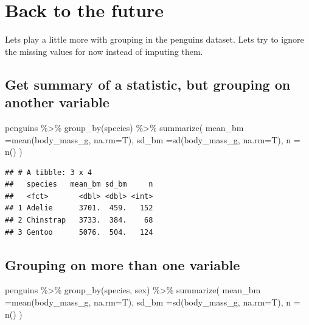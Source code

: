 \documentclass[
]{book}
\newenvironment{Shaded}{\begin{snugshade}}{\end{snugshade}}
\newcommand{\AttributeTok}[1]{\textcolor[rgb]{0.77,0.63,0.00}{#1}}
\newcommand{\FunctionTok}[1]{\textcolor[rgb]{0.00,0.00,0.00}{#1}}
\newcommand{\NormalTok}[1]{#1}
\newcommand{\SpecialCharTok}[1]{\textcolor[rgb]{0.00,0.00,0.00}{#1}}
\begin{document}
\hypertarget{back-to-the-future}{%
\section{Back to the future}\label{back-to-the-future}}

Lets play a little more with grouping in the penguins dataset. Lets try
to ignore the missing values for now instead of imputing them.

\hypertarget{get-summary-of-a-statistic-but-grouping-on-another-variable}{%
\subsection{Get summary of a statistic, but grouping on another
variable}\label{get-summary-of-a-statistic-but-grouping-on-another-variable}}

\begin{Shaded}
\begin{Highlighting}[]
\NormalTok{penguins }\SpecialCharTok{\%\textgreater{}\%} 
  \FunctionTok{group\_by}\NormalTok{(species) }\SpecialCharTok{\%\textgreater{}\%}
  \FunctionTok{summarize}\NormalTok{(}
    \AttributeTok{mean\_bm =}\FunctionTok{mean}\NormalTok{(body\_mass\_g, }\AttributeTok{na.rm=}\NormalTok{T),}
    \AttributeTok{sd\_bm   =}\FunctionTok{sd}\NormalTok{(body\_mass\_g, }\AttributeTok{na.rm=}\NormalTok{T),}
    \AttributeTok{n            =} \FunctionTok{n}\NormalTok{()}
\NormalTok{)}
\end{Highlighting}
\end{Shaded}

\begin{verbatim}
## # A tibble: 3 x 4
##   species   mean_bm sd_bm     n
##   <fct>       <dbl> <dbl> <int>
## 1 Adelie      3701.  459.   152
## 2 Chinstrap   3733.  384.    68
## 3 Gentoo      5076.  504.   124
\end{verbatim}

\hypertarget{grouping-on-more-than-one-variable}{%
\subsection{Grouping on more than one
variable}\label{grouping-on-more-than-one-variable}}

\begin{Shaded}
\begin{Highlighting}[]
\NormalTok{penguins }\SpecialCharTok{\%\textgreater{}\%} 
  \FunctionTok{group\_by}\NormalTok{(species, sex) }\SpecialCharTok{\%\textgreater{}\%}
  \FunctionTok{summarize}\NormalTok{(}
    \AttributeTok{mean\_bm =}\FunctionTok{mean}\NormalTok{(body\_mass\_g, }\AttributeTok{na.rm=}\NormalTok{T),}
    \AttributeTok{sd\_bm   =}\FunctionTok{sd}\NormalTok{(body\_mass\_g, }\AttributeTok{na.rm=}\NormalTok{T),}
    \AttributeTok{n            =} \FunctionTok{n}\NormalTok{()}
\NormalTok{)}
\end{Highlighting}
\end{Shaded}
\end{document}
